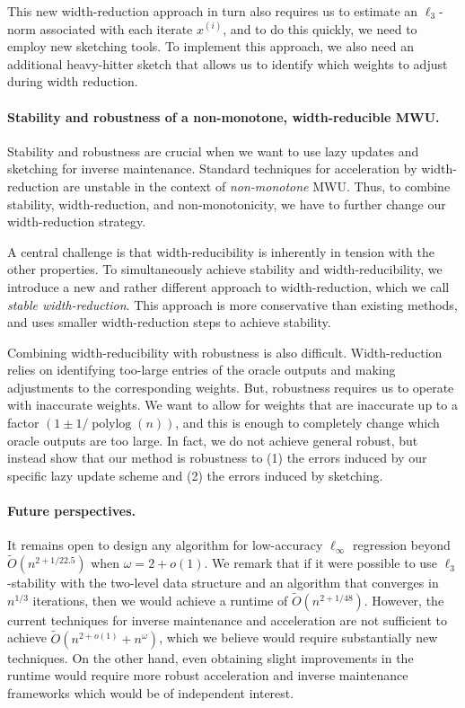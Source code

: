 \documentclass[11pt]{article}
\newcommand\xx{\boldsymbol{\mathit{x}}}
\newcommand\Otil{\widetilde{O}}
\begin{document}
This new width-reduction approach in turn also requires us to estimate an $\ell_3$-norm associated with each iterate $\xx^{(i)}$, and to do this quickly, we need to employ new sketching tools.
To implement this approach, we also need an additional heavy-hitter sketch that allows us to identify which weights to adjust during width reduction.


\paragraph{Stability and robustness of a non-monotone, width-reducible MWU.}
Stability and robustness are crucial when we want to use lazy updates and sketching for inverse maintenance.
Standard techniques for acceleration by width-reduction are unstable in the context of \emph{non-monotone} MWU.
Thus, to combine stability, width-reduction, and non-monotonicity, we have to further change our width-reduction strategy. 

A central challenge is that width-reducibility is inherently in tension with the other properties.
To simultaneously achieve stability and width-reducibility, we introduce a new and rather different approach to width-reduction, which we call \emph{stable width-reduction}.
This approach is more conservative than existing methods, and uses smaller width-reduction steps to achieve stability. 

Combining width-reducibility with robustness is also difficult. Width-reduction relies on identifying too-large entries of the oracle outputs and making adjustments to the corresponding weights.
But, robustness requires us to operate with inaccurate weights. We want to allow for weights that are inaccurate up to a factor $(1\pm 1/\operatorname{polylog}(n))$, and this is enough to completely change which oracle outputs are too large.
In fact, we do not achieve general robust, but instead show that our method is robustness to (1) the errors induced by our specific lazy update scheme and (2) the errors induced by sketching.

\paragraph{Future perspectives.}
It remains open to design any algorithm for low-accuracy $\ell_{\infty}$ regression beyond $\Otil( n^{2+1/22.5})$ when $\omega = 2+o(1)$. We remark that if it were possible to use $\ell_3$-stability with the two-level data structure and an algorithm that converges in $n^{1/3}$ iterations, then we would achieve a runtime of $\Otil(n^{2+1/48})$. However, the current techniques for inverse maintenance and acceleration are not sufficient to achieve $\Otil(n^{2+o(1)} + n^\omega)$, which we believe would require substantially new techniques. On the other hand, even obtaining slight improvements in the runtime would require more robust acceleration and inverse maintenance frameworks which would be of independent interest.
\end{document}
